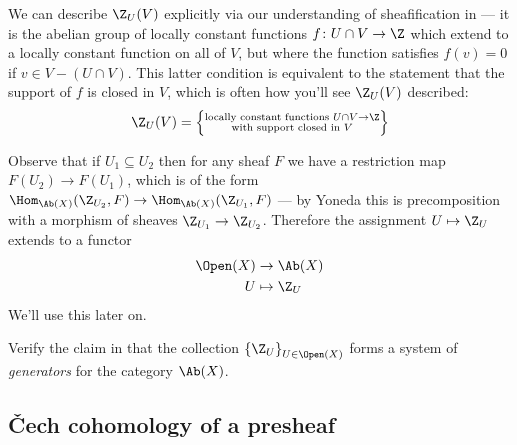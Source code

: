\documentclass[11pt]{book}
\begin{document}
\begin{remark} We can describe $\Z_U(V)$ explicitly via our understanding of sheafification in  --- it is the abelian group of locally constant functions $f \colon U \cap V \to \Z$ which extend to a locally constant function on all of $V$, but where the function satisfies $f(v) = 0$ if $v\in V \minus (U\cap V)$. This latter condition is equivalent to the statement that the support of $f$ is closed in $V$, which is often how you'll see $\Z_U(V)$ described:
\begin{align*}
    \Z_U(V) = \left\{ \substack{\text{locally constant functions } U\cap V \to \Z\\ \text{with support closed in }V} \right\}
\end{align*}
\end{remark}

Observe that if $U_1 \subseteq U_2$ then for any sheaf $F$ we have a restriction map $F(U_2) \to F(U_1)$, which is of the form $\Hom_{\Ab(X)}(\Z_{U_2},F) \to \Hom_{\Ab(X)}(\Z_{U_1},F)$ --- by Yoneda this is precomposition with a morphism of sheaves $\Z_{U_1}\to \Z_{U_2}$. Therefore the assignment $U\mapsto \Z_U$ extends to a functor
\begin{equation}\label{eqn:U-to-ZU-functor}
\begin{aligned}
    \Open(X) &\to \Ab(X) \\
    U &\mapsto \Z_U
\end{aligned}
\end{equation}
We'll use this later on.


\begin{exercise} Verify the claim in \cite[1.9.2]{Tohoku} that the collection $\left\{ \Z_U \right\}_{U\in \Open(X)}$ forms a system of \emph{generators} for the category $\Ab(X)$.
\end{exercise}

\subsection{\v{C}ech cohomology of a presheaf}
\end{document}
